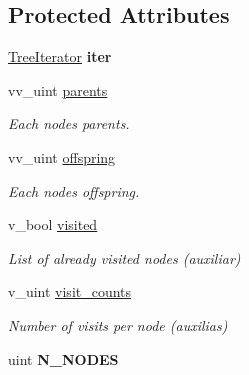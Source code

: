 \subsection*{Protected Attributes}
\begin{DoxyCompactItemize}
\item 
\mbox{\label{classTree_aae304834dc2c72501d76735331ae4c44}} 
\hyperlink{classTreeIterator}{Tree\+Iterator} {\bfseries iter}
\item 
\mbox{\label{classTree_a4d26e079c9d0b250a4bda27de8ad223c}} 
vv\+\_\+uint \hyperlink{classTree_a4d26e079c9d0b250a4bda27de8ad223c}{parents}
\begin{DoxyCompactList}\small\item\em Each nodes\textquotesingle{} parents. \end{DoxyCompactList}\item 
\mbox{\label{classTree_ade5fd3ba5b6480c4edf8590eb0e41e34}} 
vv\+\_\+uint \hyperlink{classTree_ade5fd3ba5b6480c4edf8590eb0e41e34}{offspring}
\begin{DoxyCompactList}\small\item\em Each nodes\textquotesingle{} offspring. \end{DoxyCompactList}\item 
\mbox{\label{classTree_a45813764070bd88238a3372c16b423fa}} 
v\+\_\+bool \hyperlink{classTree_a45813764070bd88238a3372c16b423fa}{visited}
\begin{DoxyCompactList}\small\item\em List of already visited nodes (auxiliar) \end{DoxyCompactList}\item 
\mbox{\label{classTree_ac504d0c090c1f76363fc00cff2de0e7f}} 
v\+\_\+uint \hyperlink{classTree_ac504d0c090c1f76363fc00cff2de0e7f}{visit\+\_\+counts}
\begin{DoxyCompactList}\small\item\em Number of visits per node (auxilias) \end{DoxyCompactList}\item 
\mbox{\label{classTree_a41b7a5ddd47b82688c099ee47561eb4f}} 
uint {\bfseries N\+\_\+\+N\+O\+D\+ES}
\item 
\mbox{\label{classTree_a123cdf871af449443aa8b7c05029d72a}} 

\end{DoxyCompactItemize}

